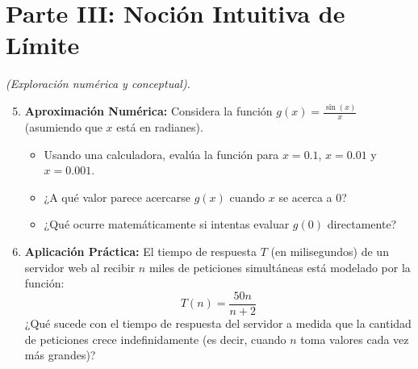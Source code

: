 \documentclass[12pt,a4paper]{article}
\begin{document}
\vspace{2.5cm}

\section*{Parte III: Noción Intuitiva de Límite}
\textit{(Exploración numérica y conceptual).}

\begin{enumerate}
    \setcounter{enumi}{4}
    \item \textbf{Aproximación Numérica:} Considera la función $g(x) = \frac{\sin(x)}{x}$ (asumiendo que $x$ está en radianes). 
    \begin{itemize}
        \item Usando una calculadora, evalúa la función para $x = 0.1$, $x = 0.01$ y $x = 0.001$. 
        \item ¿A qué valor parece acercarse $g(x)$ cuando $x$ se acerca a $0$? 
        \item ¿Qué ocurre matemáticamente si intentas evaluar $g(0)$ directamente?
    \end{itemize}

    \vspace{3cm}

    \item \textbf{Aplicación Práctica:} El tiempo de respuesta $T$ (en milisegundos) de un servidor web al recibir $n$ miles de peticiones simultáneas está modelado por la función:
    \[ T(n) = \frac{50n}{n+2} \]
    ¿Qué sucede con el tiempo de respuesta del servidor a medida que la cantidad de peticiones crece indefinidamente (es decir, cuando $n$ toma valores cada vez más grandes)?
\end{enumerate}
\end{document}
